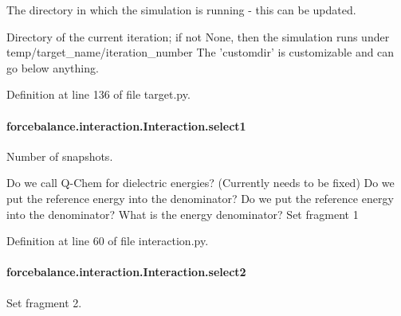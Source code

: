 The directory in which the simulation is running -\/ this can be updated. 

Directory of the current iteration; if not None, then the simulation runs under temp/target\-\_\-name/iteration\-\_\-number The 'customdir' is customizable and can go below anything.

Definition at line 136 of file target.\-py.

\hypertarget{classforcebalance_1_1interaction_1_1Interaction_a22c4a698eb3bf91187894fdce874e8d5}{
\paragraph[{select1}]{\setlength{\rightskip}{0pt plus 5cm}forcebalance.\-interaction.\-Interaction.\-select1\hspace{0.3cm}{\ttfamily [inherited]}}}\label{classforcebalance_1_1interaction_1_1Interaction_a22c4a698eb3bf91187894fdce874e8d5}


Number of snapshots. 

Do we call Q-\/\-Chem for dielectric energies? (Currently needs to be fixed) Do we put the reference energy into the denominator? Do we put the reference energy into the denominator? What is the energy denominator? Set fragment 1 

Definition at line 60 of file interaction.\-py.

\hypertarget{classforcebalance_1_1interaction_1_1Interaction_acbdfffa2596af6c90adf0bfe071d2205}{
\paragraph[{select2}]{\setlength{\rightskip}{0pt plus 5cm}forcebalance.\-interaction.\-Interaction.\-select2\hspace{0.3cm}{\ttfamily [inherited]}}}\label{classforcebalance_1_1interaction_1_1Interaction_acbdfffa2596af6c90adf0bfe071d2205}


Set fragment 2. 



